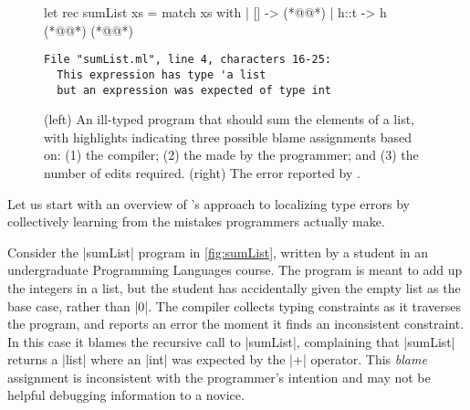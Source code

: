 \label{sec:nate:overview}


\begin{figure}[t!]
\begin{minipage}{0.45\linewidth}
\begin{ecode}
  let rec sumList xs =
    match xs with
    | []   -> (*@\hlTree{\hlSherrloc{[]}}@*)
    | h::t -> h (*@\hlTree{+}@*) (*@@*)
\end{ecode}
\end{minipage}
\begin{minipage}{0.49\linewidth}
\begin{verbatim}
File "sumList.ml", line 4, characters 16-25:
  This expression has type 'a list
  but an expression was expected of type int
\end{verbatim}
\end{minipage}
\caption{(left) An ill-typed \ocaml program that should sum the elements of a
  list, with highlights indicating three possible blame assignments based on:
  (1) the \hlFix{\ocaml} compiler;
  (2) the  made by the programmer; and
  (3)  the number of edits required.
  (right) The error reported by \ocaml.}
\label{fig:sumList}
\end{figure}


Let us start with an overview of \toolname's
approach to localizing type errors by
collectively learning from the mistakes
programmers actually make.

%
Consider the |sumList| program in
\autoref{fig:sumList}, written by
a student in an undergraduate
Programming Languages course.
%
The program is meant to add up the
integers in a list, but the student
has accidentally given the empty
list as the base case, rather than |0|.
%
The \ocaml compiler collects typing
constraints as it traverses the program,
and reports an error the moment it finds
an inconsistent constraint.
%
In this case it blames the recursive call
to |sumList|, complaining that |sumList|
returns a |list| where an |int| was
expected by the |+| operator.
%
This \emph{blame} assignment is inconsistent
with the programmer's intention and may
not be helpful debugging information to
a novice.

